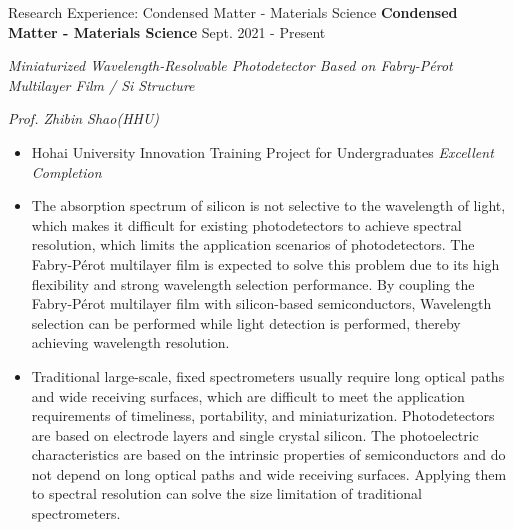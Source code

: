 \documentclass[9pt,aspectratio=169,hyperref=colorlinks]{beamer}
\begin{document}
\begin{frame}{Research Experience: Condensed Matter - Materials Science}
    \medskip \textbf{Condensed Matter - Materials Science} \hfill Sept. 2021 - Present

    \quad \textit{Miniaturized Wavelength-Resolvable Photodetector Based on Fabry-P\'{e}rot Multilayer Film / Si Structure}

    \hfill \textit{Prof. Zhibin Shao(HHU)}

    \begin{itemize}
        \item Hohai University Innovation Training Project for Undergraduates \textit{Excellent Completion}
        \item The absorption spectrum of silicon is not selective to the wavelength of light, which makes it difficult for existing photodetectors to achieve spectral resolution, which limits the application scenarios of photodetectors. The Fabry-P\'{e}rot multilayer film is expected to solve this problem due to its high flexibility and strong wavelength selection performance. By coupling the Fabry-P\'{e}rot multilayer film with silicon-based semiconductors, Wavelength selection can be performed while light detection is performed, thereby achieving wavelength resolution.
        \item Traditional large-scale, fixed spectrometers usually require long optical paths and wide receiving surfaces, which are difficult to meet the application requirements of timeliness, portability, and miniaturization. Photodetectors are based on electrode layers and single crystal silicon. The photoelectric characteristics are based on the intrinsic properties of semiconductors and do not depend on long optical paths and wide receiving surfaces. Applying them to spectral resolution can solve the size limitation of traditional spectrometers.
    \end{itemize}
\end{frame}
\end{document}
